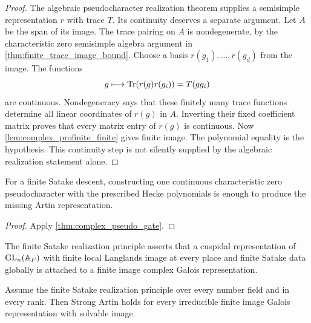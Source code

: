 \begin{proof}
The algebraic pseudocharacter realization theorem supplies a semisimple representation \(r\) with trace \(T\). Its continuity deserves a separate argument. Let \(A\) be the span of its image. The trace pairing on \(A\) is nondegenerate, by the characteristic zero semisimple algebra argument in \cref{thm:finite_trace_image_bound}. Choose a basis \(r(g_1),\ldots,r(g_d)\) from the image. The functions
\[
 g\longmapsto\operatorname{Tr}(r(g)r(g_i))=T(gg_i)
\]
are continuous. Nondegeneracy says that these finitely many trace functions determine all linear coordinates of \(r(g)\) in \(A\). Inverting their fixed coefficient matrix proves that every matrix entry of \(r(g)\) is continuous. Now \cref{lem:complex_profinite_finite} gives finite image. The polynomial equality is the hypothesis. This continuity step is not silently supplied by the algebraic realization statement alone.
\end{proof}

\begin{corollary}\label{cor:pseudo_bottleneck}
For a finite Satake descent, constructing one continuous characteristic zero pseudocharacter with the prescribed Hecke polynomials is enough to produce the missing Artin representation.
\end{corollary}

\begin{proof}
Apply \cref{thm:complex_pseudo_gate}.
\end{proof}

\begin{definition}\label{def:finite_satake_principle}
The finite Satake realization principle asserts that a cuspidal representation of \(\operatorname{GL}_n(\mathbb A_F)\) with finite local Langlands image at every place and finite Satake data globally is attached to a finite image complex Galois representation.
\end{definition}

\begin{theorem}\label{thm:FS_implies_solvable_artin}
Assume the finite Satake realization principle over every number field and in every rank. Then Strong Artin holds for every irreducible finite image Galois representation with solvable image.
\end{theorem}

